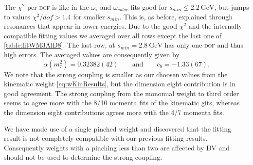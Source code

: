 \documentclass[../../index.tex]{subfiles}
\begin{document}
The $\chi^2$ per \textsc{dof} is like in the $\omega_\tau$ and $\omega_{cubic}$
fits good for $s_{min}\leq \SI{2.2}{\giga\eV}$, but jumps to values
$\chi^2/dof>1.4$ for smaller $s_{min}$. This is, as before, explained through
resonances that appear in lower energies. Due to the good $\chi^2$ and the
internally compatible fitting values we averaged over all rows except the last
one of \cref{table:fitWM3AlD8}. The last row, at $s_{min}=\SI{2.8}{\giga\eV}$
has only one \textsc{dof} and thus high errors. The averaged values are
consequently given by 
\begin{equation}
  \alpha(m_\tau^2) = 0.32382(42) \qquad \text{and} \qquad c_8=-1.33(67).
\end{equation}
We note that the strong coupling is smaller as our choosen values from the
kinematic weight \cref{eq:wKinResults}, but the dimension eight contribution
is in good agreement. The strong coupling from the monomial weight to third
order seems to agree more with the 8\-/10 momenta fits of the kinematic gits, whereas
the dimension eight contributions agrees more with the 4\-/7 momenta fits.

We have made use of a single pinched weight and discovered that the fitting
result is not completely compatible with our previous fitting results.
Consequently weights with a pinching less than two are affected by \textsc{DV}
and should not be used to determine the strong coupling.
\end{document}
